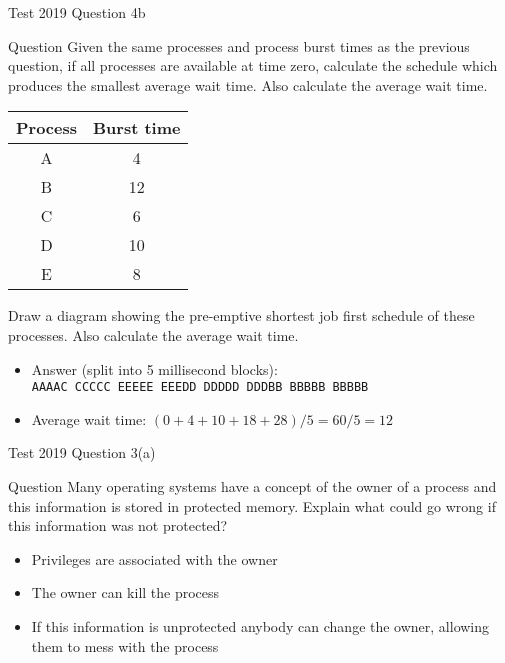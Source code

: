 \documentclass[notes]{beamer}
\begin{document}
\begin{frame}{Test 2019 Question 4b}
    \begin{alertblock}{Question}
        Given the same processes and process burst times as the previous question, if all processes are available at time zero, calculate the schedule which produces the smallest average wait time. Also calculate the average wait time.
        \begin{table}
            \centering
            \begin{tabular}{c|c}
                \hline
                Process & Burst time \\ \hline
                A       & 4          \\ \hline
                B       & 12         \\ \hline
                C       & 6          \\ \hline
                D       & 10         \\ \hline
                E       & 8          \\ \hline
            \end{tabular}
        \end{table}
        Draw a diagram showing the pre-emptive shortest job first schedule of these processes. Also calculate the average wait time.
    \end{alertblock}
    \pause
    \begin{itemize}
        \item Answer (split into 5 millisecond blocks):\\ \texttt{AAAAC CCCCC EEEEE EEEDD DDDDD DDDBB BBBBB BBBBB}
        \item Average wait time: $(0 + 4 + 10 + 18 + 28) / 5 = 60 / 5 = 12$
    \end{itemize}
\end{frame}
\begin{frame}{Test 2019 Question 3(a)}
    \begin{alertblock}{Question}
        Many operating systems have a concept of the owner of a process and this information is stored in protected memory. Explain what could go wrong if this information was not protected?
    \end{alertblock}
    \pause
    \begin{itemize}
        \item Privileges are associated with the owner
        \item The owner can kill the process
        \item If this information is unprotected anybody can change the owner, allowing them to mess with the process
    \end{itemize}
\end{frame}
\end{document}
